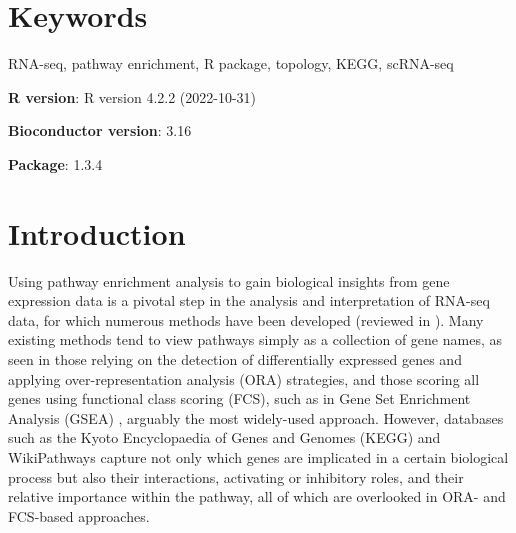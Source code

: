 \documentclass[9pt,a4paper,]{extarticle}
\begin{document}
\section*{Keywords}
RNA-seq, pathway enrichment, R package, topology, KEGG, scRNA-seq


\clearpage
\pagestyle{main}

\textbf{R version}: R version 4.2.2 (2022-10-31)

\textbf{Bioconductor version}: 3.16

\textbf{Package}: 1.3.4

\hypertarget{introduction}{%
\section{Introduction}\label{introduction}}

Using pathway enrichment analysis to gain biological insights from gene expression data is a pivotal step in the analysis and interpretation of RNA-seq data, for which numerous methods have been developed (reviewed in \citep{Maleki2020-ur, Mubeen2022-eq}).
Many existing methods tend to view pathways simply as a collection of gene names, as seen in those relying on the detection of differentially expressed genes and applying over-representation analysis (ORA) strategies, and those scoring all genes using functional class scoring (FCS), such as in Gene Set Enrichment Analysis (GSEA) \citep{Subramanian2005-lx}, arguably the most widely-used approach.
However, databases such as the Kyoto Encyclopaedia of Genes and Genomes (KEGG)\citep{OgataKEGGKyotoEncyclopediaa} and WikiPathways\citep{Martens2021} capture not only which genes are implicated in a certain biological process but also their interactions, activating or inhibitory roles, and their relative importance within the pathway, all of which are overlooked in ORA- and FCS-based approaches.
\end{document}
